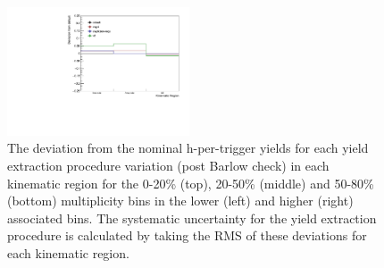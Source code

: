 \begin{figure}[ht]
    \includegraphics[width=0.48\textwidth]{figures/analysis/h_lambda_50_80_highpt_yield_variation.pdf}
    \caption{The deviation from the nominal h-\lmb per-trigger yields for each yield extraction procedure variation (post Barlow check) in each kinematic region for the 0-20\% (top), 20-50\% (middle) and 50-80\% (bottom) multiplicity bins in the lower (left) and higher (right) associated \pt bins. The systematic uncertainty for the yield extraction procedure is calculated by taking the RMS of these deviations for each kinematic region.}
    \label{fig:h_lambda_yield_deviations}
\end{figure}

